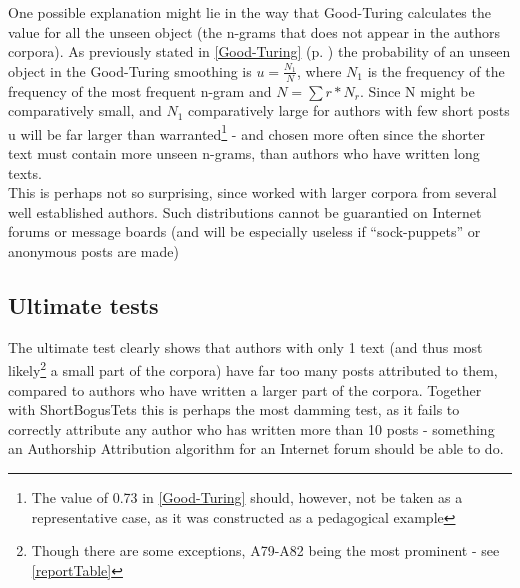 One possible explanation might lie in the way that Good-Turing calculates the value for all the unseen object (the n-grams that does not appear in the authors corpora). As previously stated in \ref{Good-Turing} (p. \pageref{Good-Turing}) the probability of an unseen object in the Good-Turing smoothing is $u =\frac{N_1}{N}$, where $N_1$ is the frequency of the frequency of the most frequent n-gram and $N =\sum r * N_r$. Since N might be comparatively small, and $N_1$ comparatively large for authors with few short posts u will be far larger than warranted\footnote{The value of 0.73 in \ref{Good-Turing} should, however, not be taken as a representative case, as it was constructed as a pedagogical example} - and chosen more often since the shorter text must contain more unseen n-grams, than authors who have written long texts.\\

This is perhaps not so surprising, since \cite{nr4} worked with larger corpora from several well established authors. Such distributions cannot be guarantied on Internet forums or message boards (and will be especially useless if ``sock-puppets'' or anonymous posts are made) 

\subsection{Ultimate tests}
The ultimate test clearly shows that authors with only 1 text (and thus most likely\footnote{Though there are some exceptions, A79-A82 being the most prominent - see \ref{reportTable}} a small part of the corpora) have far too many posts attributed to them, compared to authors who have written a larger part of the corpora. Together with ShortBogusTets this is perhaps the most damming test, as it fails to correctly attribute any author who has written more than 10 posts - something an Authorship Attribution algorithm for an Internet forum should be able to do.  

